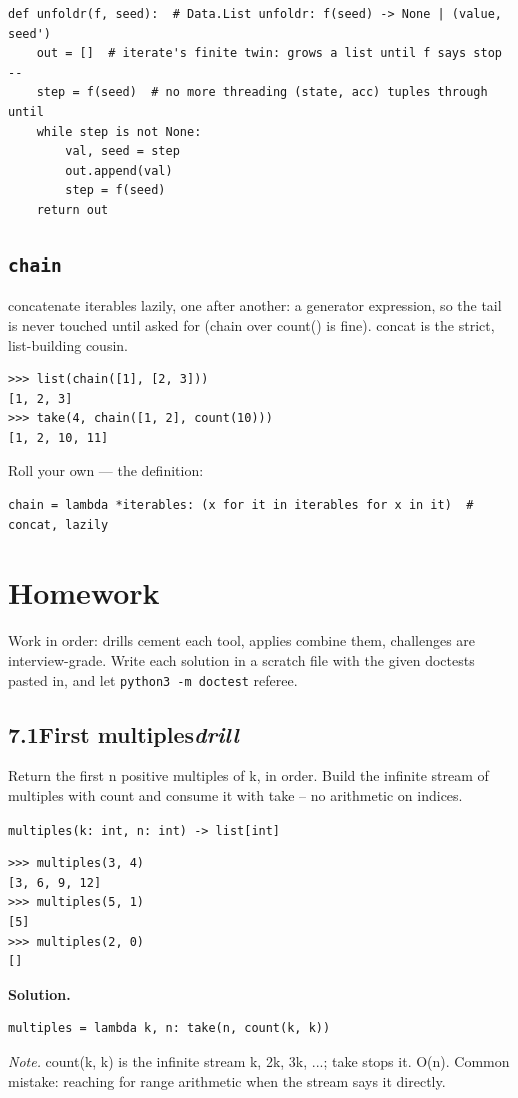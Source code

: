 \documentclass[10pt,letterpaper]{book}
\begin{document}
\begin{lstlisting}[style=ex]
def unfoldr(f, seed):  # Data.List unfoldr: f(seed) -> None | (value, seed')
    out = []  # iterate's finite twin: grows a list until f says stop --
    step = f(seed)  # no more threading (state, acc) tuples through until
    while step is not None:
        val, seed = step
        out.append(val)
        step = f(seed)
    return out
\end{lstlisting}

\subsection{\texttt{chain}}\label{def:chain}
concatenate iterables lazily, one after another: a generator expression, so the tail is never touched until asked for (chain over count() is fine). concat is the strict, list-building cousin.
\begin{lstlisting}[style=ex]
>>> list(chain([1], [2, 3]))
[1, 2, 3]
>>> take(4, chain([1, 2], count(10)))
[1, 2, 10, 11]
\end{lstlisting}

Roll your own --- the definition:

\begin{lstlisting}[style=ex]
chain = lambda *iterables: (x for it in iterables for x in it)  # concat, lazily
\end{lstlisting}

\section{Homework}
Work in order: drills cement each tool, applies combine them,
challenges are interview-grade. Write each solution in a scratch file with
the given doctests pasted in, and let \texttt{python3 -m doctest} referee.
\subsection*{7.1\quad First multiples\hfill\textnormal{\textit{drill}}}
Return the first n positive multiples of k, in order. Build the infinite stream of multiples with count and consume it with take -- no arithmetic on indices.

\noindent\texttt{multiples(k: int, n: int) -> list[int]}
\begin{lstlisting}[style=ex]
>>> multiples(3, 4)
[3, 6, 9, 12]
>>> multiples(5, 1)
[5]
>>> multiples(2, 0)
[]
\end{lstlisting}
\noindent\textbf{Solution.}
\begin{lstlisting}[style=code]
multiples = lambda k, n: take(n, count(k, k))
\end{lstlisting}
\noindent\textit{Note.} count(k, k) is the infinite stream k, 2k, 3k, ...; take stops it. O(n). Common mistake: reaching for range arithmetic when the stream says it directly.
\end{document}
